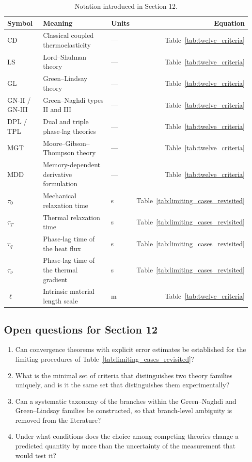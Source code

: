 \begin{table}[h]
\centering
\small
\caption{Notation introduced in Section 12.}
\label{tab:notation-sec12}
\begin{tabularx}{\textwidth}{@{}lXlr@{}}
\toprule
\textbf{Symbol} & \textbf{Meaning} & \textbf{Units} & \textbf{Equation} \\
\midrule
CD & Classical coupled thermoelasticity & --- & Table~\ref{tab:twelve_criteria} \\
LS & Lord--Shulman theory & --- & Table~\ref{tab:twelve_criteria} \\
GL & Green--Lindsay theory & --- & Table~\ref{tab:twelve_criteria} \\
GN-II / GN-III & Green--Naghdi types II and III & --- & Table~\ref{tab:twelve_criteria} \\
DPL / TPL & Dual and triple phase-lag theories & --- & Table~\ref{tab:twelve_criteria} \\
MGT & Moore--Gibson--Thompson theory & --- & Table~\ref{tab:twelve_criteria} \\
MDD & Memory-dependent derivative formulation & --- & Table~\ref{tab:twelve_criteria} \\
$\tau_0$ & Mechanical relaxation time & s & Table~\ref{tab:limiting_cases_revisited} \\
$\tau_T$ & Thermal relaxation time & s & Table~\ref{tab:limiting_cases_revisited} \\
$\tau_q$ & Phase-lag time of the heat flux & s & Table~\ref{tab:limiting_cases_revisited} \\
$\tau_\nu$ & Phase-lag time of the thermal gradient & s & Table~\ref{tab:limiting_cases_revisited} \\
$\ell$ & Intrinsic material length scale & m & Table~\ref{tab:twelve_criteria} \\
\bottomrule
\end{tabularx}
\end{table}

\subsection{Open questions for Section 12}

\begin{enumerate}[label=\textbf{OQ12.\arabic*}]
\item Can convergence theorems with explicit error estimates be established for the limiting procedures of Table~\ref{tab:limiting_cases_revisited}? \label{oq:12.1}
\item What is the minimal set of criteria that distinguishes two theory families uniquely, and is it the same set that distinguishes them experimentally? \label{oq:12.2}
\item Can a systematic taxonomy of the branches within the Green--Naghdi and Green--Lindsay families be constructed, so that branch-level ambiguity is removed from the literature? \label{oq:12.3}
\item Under what conditions does the choice among competing theories change a predicted quantity by more than the uncertainty of the measurement that would test it? \label{oq:12.4}
\end{enumerate}

